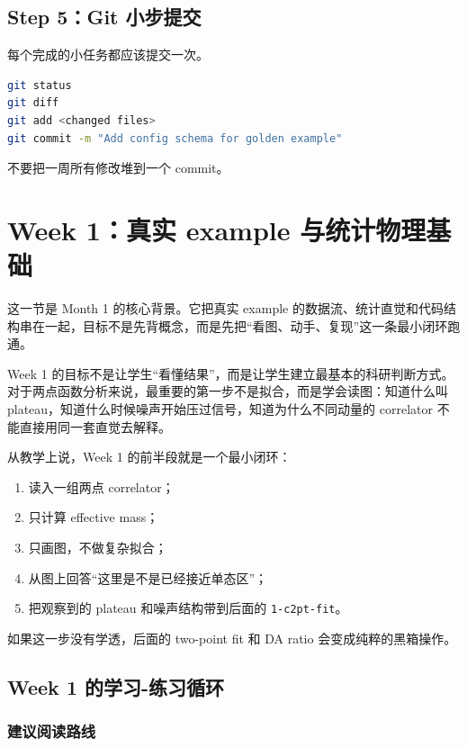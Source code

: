 \documentclass[11pt,a4paper,fontset=fandol]{ctexart}
\begin{document}
\subsection{Step 5：Git 小步提交}

每个完成的小任务都应该提交一次。

\begin{lstlisting}[language=bash]
git status
git diff
git add <changed files>
git commit -m "Add config schema for golden example"
\end{lstlisting}

不要把一周所有修改堆到一个 commit。

\section{Week 1：真实 example 与统计物理基础}

这一节是 Month 1 的核心背景。它把真实 example 的数据流、统计直觉和代码结构串在一起，目标不是先背概念，而是先把“看图、动手、复现”这一条最小闭环跑通。

Week 1 的目标不是让学生“看懂结果”，而是让学生建立最基本的科研判断方式。对于两点函数分析来说，最重要的第一步不是拟合，而是学会读图：知道什么叫 plateau，知道什么时候噪声开始压过信号，知道为什么不同动量的 correlator 不能直接用同一套直觉去解释。

从教学上说，Week 1 的前半段就是一个最小闭环：

\begin{enumerate}[leftmargin=2em]
  \item 读入一组两点 correlator；
  \item 只计算 effective mass；
  \item 只画图，不做复杂拟合；
  \item 从图上回答“这里是不是已经接近单态区”；
  \item 把观察到的 plateau 和噪声结构带到后面的 \lstinline|1-c2pt-fit|。
\end{enumerate}

如果这一步没有学透，后面的 two-point fit 和 DA ratio 会变成纯粹的黑箱操作。

\subsection{Week 1 的学习-练习循环}

\subsubsection{建议阅读路线}
\end{document}
